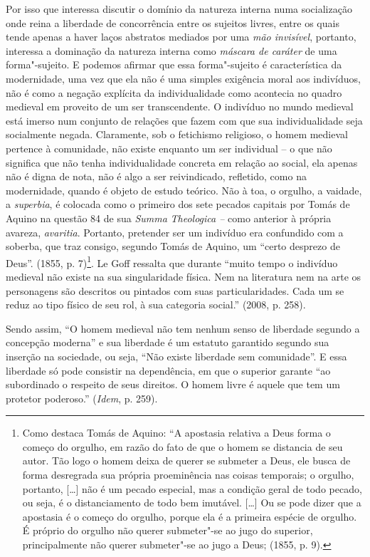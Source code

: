 Por isso que interessa discutir o domínio da natureza interna
numa socialização onde reina a liberdade de concorrência entre os
sujeitos livres, entre os quais tende apenas a haver laços abstratos
mediados por uma \emph{mão invisível}, portanto, interessa a dominação
da natureza interna como \emph{máscara de caráter} de uma
forma"-sujeito. E podemos afirmar que essa forma"-sujeito é característica
da modernidade, uma vez que ela não é uma simples exigência moral aos
indivíduos, não é como a negação explícita da individualidade como
acontecia no quadro medieval em proveito de um ser transcendente. O
indivíduo no mundo medieval está imerso num conjunto de relações que
fazem com que sua individualidade seja socialmente negada. Claramente,
sob o fetichismo religioso, o homem medieval pertence à comunidade, não
existe enquanto um ser individual -- o que não significa que não tenha
individualidade concreta em relação ao social, ela apenas não é digna de
nota, não é algo a ser reivindicado, refletido, como na modernidade,
quando é objeto de estudo teórico. Não à toa, o orgulho, a vaidade, a
\emph{superbia}, é colocada como o primeiro dos sete pecados capitais
por Tomás de Aquino na questão 84 de sua \emph{Summa} \emph{Theologica
--} como anterior à própria avareza, \emph{avaritia}. Portanto,
pretender ser um indivíduo era confundido com a soberba, que traz
consigo, segundo Tomás de Aquino, um ``certo desprezo de Deus''. (1855,
p. 7)\footnote{Como destaca Tomás de Aquino: ``A apostasia relativa a
  Deus forma o começo do orgulho, em razão do fato de que o homem se
  distancia de seu autor. Tão logo o homem deixa de querer se submeter a
  Deus, ele busca de forma desregrada sua própria proeminência nas
  coisas temporais; o orgulho, portanto, [\ldots{}] não é um pecado
  especial, mas a condição geral de todo pecado, ou seja, é o
  distanciamento de todo bem imutável. [\ldots{}] Ou se pode dizer
  que a apostasia é o começo do orgulho, porque ela é a primeira espécie
  de orgulho. É próprio do orgulho não querer submeter"-se ao jugo do
  superior, principalmente não querer submeter"-se ao jugo a Deus; (1855,
  p. 9).}. Le Goff ressalta que durante ``muito tempo o indivíduo
medieval não existe na sua singularidade física. Nem na literatura nem
na arte os personagens são descritos ou pintados com suas
particularidades. Cada um se reduz ao tipo físico de seu rol, à sua
categoria social.'' (2008, p. 258).

Sendo assim, ``O homem medieval não tem nenhum senso de liberdade
segundo a concepção moderna'' e sua liberdade é um estatuto garantido
segundo sua inserção na sociedade, ou seja, ``Não existe liberdade sem
comunidade''. E essa liberdade só pode consistir na dependência, em que
o superior garante ``ao subordinado o respeito de seus direitos. O homem
livre é aquele que tem um protetor poderoso.'' (\emph{Idem}, p. 259).

